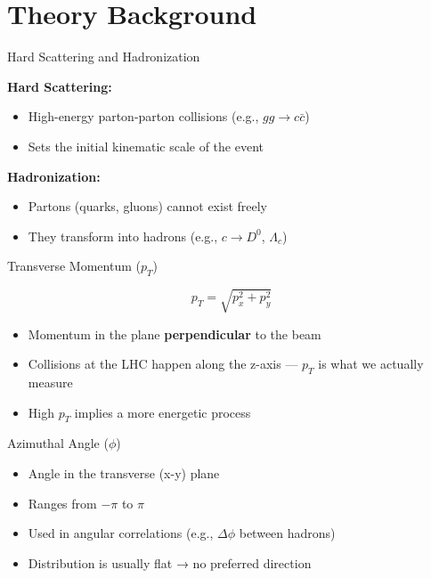\documentclass[10pt]{beamer}
\begin{document}
\section{Theory Background}

\begin{frame}{Hard Scattering and Hadronization}

\textbf{Hard Scattering:}
\begin{itemize}
    \item High-energy parton-parton collisions (e.g., \( gg \to c\bar{c} \))
    \item Sets the initial kinematic scale of the event
\end{itemize}

\textbf{Hadronization:}
\begin{itemize}
    \item Partons (quarks, gluons) cannot exist freely
    \item They transform into hadrons (e.g., \( c \to D^0 \), \( \Lambda_c \))
\end{itemize}

\end{frame}

\begin{frame}{Transverse Momentum (\( p_T \))}

\[
p_T = \sqrt{p_x^2 + p_y^2}
\]

\begin{itemize}
    \item Momentum in the plane \textbf{perpendicular} to the beam
    \item Collisions at the LHC happen along the z-axis — \( p_T \) is what we actually measure
    \item High \( p_T \) implies a more energetic process
\end{itemize}

\end{frame}

\begin{frame}{Azimuthal Angle (\( \phi \))}

\begin{itemize}
    \item Angle in the transverse (x-y) plane
    \item Ranges from \( -\pi \) to \( \pi \)
    \item Used in angular correlations (e.g., \( \Delta\phi \) between hadrons)
    \item Distribution is usually flat → no preferred direction
\end{itemize}

\end{frame}
\end{document}
